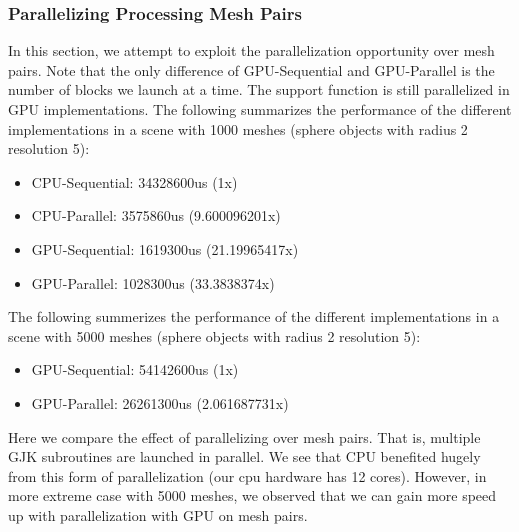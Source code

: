 \documentclass[12pt,fleqn]{article}
\begin{document}
\subsubsection{Parallelizing Processing Mesh Pairs}
In this section, we attempt to exploit the parallelization opportunity over mesh pairs. Note that the only difference of GPU-Sequential and GPU-Parallel is the number of blocks we launch at a time. The support function is still parallelized in GPU implementations.
The following summarizes the performance of the different implementations in a scene with 1000 meshes (sphere objects with radius 2 resolution 5):
\begin{itemize}
    \item CPU-Sequential: 34328600us (1x)
    \item CPU-Parallel: 3575860us (9.600096201x)
    \item GPU-Sequential: 1619300us (21.19965417x)
    \item GPU-Parallel: 1028300us (33.3838374x)
\end{itemize}

The following summerizes the performance of the different implementations in a scene with 5000 meshes (sphere objects with radius 2 resolution 5):
\begin{itemize}
    \item GPU-Sequential: 54142600us (1x)
    \item GPU-Parallel: 26261300us (2.061687731x)
\end{itemize}
Here we compare the effect of parallelizing over mesh pairs. That is, multiple GJK subroutines are launched in parallel. We see that CPU benefited hugely from this form of parallelization (our cpu hardware has 12 cores). However, in more extreme case with 5000 meshes, we observed that we can gain more speed up with parallelization with GPU on mesh pairs.
\end{document}
